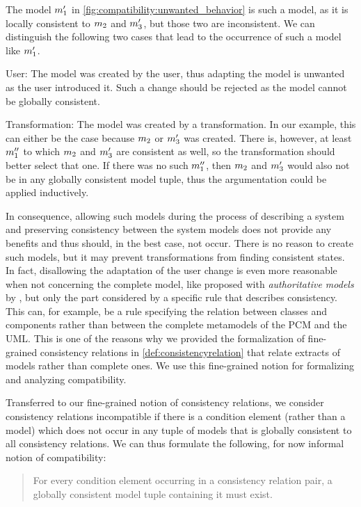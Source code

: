 The model $\model{m}{1}'$ in \autoref{fig:compatibility:unwanted_behavior} is such a model, as it is locally consistent to $\model{m}{2}$ and $\model{m}{3}'$, but those two are inconsistent.
%
We can distinguish the following two cases that lead to the occurrence of such a model like $\model{m}{1}'$.
\begin{properdescription}
    \item[User:] The model was created by the user, thus adapting the model is unwanted as the user introduced it. Such a change should be rejected as the model cannot be globally consistent.
    \item[Transformation:] The model was created by a transformation. In our example, this can either be the case because $\model{m}{2}$ or $\model{m}{3}'$ was created. There is, however, at least $\model{m}{1}''$ to which $\model{m}{2}$ and $\model{m}{3}'$ are consistent as well, so the transformation should better select that one. If there was no such $\model{m}{1}''$, then $\model{m}{2}$ and $\model{m}{3}'$ would also not be in any globally consistent model tuple, thus the argumentation could be applied inductively.
\end{properdescription}

In consequence, allowing such models during the process of describing a system and preserving consistency between the system models does not provide any benefits and thus should, in the best case, not occur.
There is no reason to create such models, but it may prevent transformations from finding consistent states.
In fact, disallowing the adaptation of the user change is even more reasonable when not concerning the complete model, like proposed with \emph{authoritative models} by \textcite{stevens2020BidirectionalTransformationLarge-SoSym}, but only the part considered by a specific rule that describes consistency.
This can, for example, be a rule specifying the relation between classes and components rather than between the complete metamodels of the \gls{PCM} and the \gls{UML}.
This is one of the reasons why we provided the formalization of fine-grained consistency relations in \autoref{def:consistencyrelation} that relate extracts of models rather than complete ones.
We use this fine-grained notion for formalizing and analyzing compatibility.

Transferred to our fine-grained notion of consistency relations, we consider consistency relations incompatible if there is a condition element (rather than a model) which does not occur in any tuple of models that is globally consistent to all consistency relations.
We can thus formulate the following, for now informal notion of compatibility:
\begin{quote}
    For every condition element occurring in a consistency relation pair, a globally consistent model tuple containing it must exist.
\end{quote}

